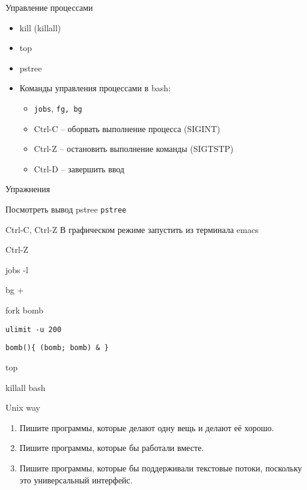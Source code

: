 \documentclass[ignorenonframetext, professionalfonts, hyperref={unicode}]{beamer}
\begin{document}
\begin{frame}{Управление процессами}
  \begin{itemize}
    \item kill (killall)
    \item top
    \item pstree
    \item Команды управления процессами в bash: 
      \begin{itemize}
        \item {\tt jobs}, {\tt fg, \tt bg}
        \item Ctrl-C -- оборвать выполнение процесса (SIGINT)
        \item Ctrl-Z -- остановить выполнение команды (SIGTSTP)
        \item Ctrl-D -- завершить ввод
      \end{itemize}
  \end{itemize}
\end{frame}


\begin{frame}{Упражнения}
  \begin{block}{Посмотреть вывод pstree}
    {\tt pstree}
  \end{block}
  \pause
  \begin{block}{Ctrl-C, Ctrl-Z}
    В графическом режиме запустить из терминала emacs

    Ctrl-Z

    jobs -l

    bg +
  \end{block}
  \pause
  \begin{block}{fork bomb}

    {\tt ulimit -u 200} 

    {\tt bomb()\{ (bomb; bomb) \& \} }

    top

    killall bash

  \end{block}
\end{frame}


\begin{frame}{Unix way}
  \begin{enumerate}
    \item Пишите программы, которые делают одну вещь и делают её хорошо.
    \item Пишите программы, которые бы работали вместе.
    \item Пишите программы, которые бы поддерживали текстовые потоки, поскольку это универсальный интерфейс. 
  \end{enumerate}
\end{frame}
\end{document}
